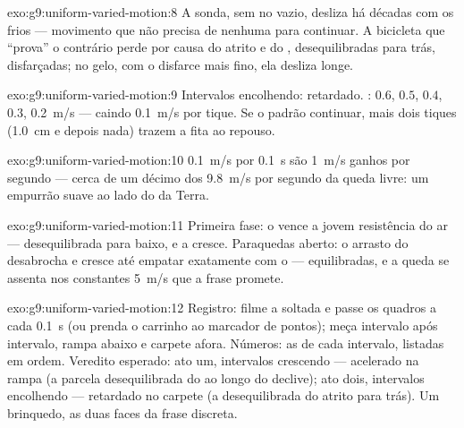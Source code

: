 \begin{solution}{exo:g9:uniform-varied-motion:8}
A sonda, sem  no vazio, desliza há décadas com os 
frios --- movimento que não precisa de  nenhuma para continuar.
A bicicleta que ``prova'' o contrário perde  por causa do
atrito e do ,  desequilibradas para trás, disfarçadas; no
gelo, com o disfarce mais fino, ela desliza longe.
\end{solution}

\begin{solution}{exo:g9:uniform-varied-motion:9}
Intervalos encolhendo: retardado. : $0.6$, $0.5$, $0.4$,
$0.3$, \qty{0.2}{m/s} --- caindo \qty{0.1}{m/s} por tique. Se o
padrão continuar, mais dois tiques (\qty{1.0}{cm} e depois nada)
trazem a fita ao repouso.
\end{solution}

\begin{solution}{exo:g9:uniform-varied-motion:10}
\qty{0.1}{m/s} por \qty{0.1}{s} são \qty{1}{m/s} ganhos por segundo
--- cerca de um décimo dos \qty{9.8}{m/s} por segundo da queda livre:
um empurrão suave ao lado do da Terra.
\end{solution}

\begin{solution}{exo:g9:uniform-varied-motion:11}
Primeira fase: o  vence a jovem resistência do ar --- 
desequilibrada para baixo, e a  cresce. Paraquedas aberto:
o arrasto do  desabrocha e cresce até empatar exatamente com o 
---  equilibradas, e a queda se assenta nos constantes
\qty{5}{m/s} que a frase promete.
\end{solution}

\begin{solution}{exo:g9:uniform-varied-motion:12}
Registro: filme a soltada e passe os quadros a cada \qty{0.1}{s} (ou
prenda o carrinho ao marcador de pontos); meça intervalo após
intervalo, rampa abaixo e carpete afora. Números: as  de
cada intervalo, listadas em ordem. Veredito esperado: ato um,
intervalos crescendo --- acelerado na rampa (a parcela desequilibrada
do  ao longo do declive); ato dois, intervalos encolhendo ---
retardado no carpete (a  desequilibrada do atrito para trás). Um
brinquedo, as duas faces da frase discreta.
\end{solution}

